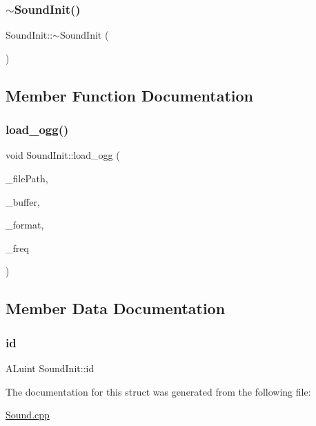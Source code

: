 \subsubsection{\texorpdfstring{$\sim$\+Sound\+Init()}{~SoundInit()}}
{\footnotesize\ttfamily Sound\+Init\+::$\sim$\+Sound\+Init (\begin{DoxyParamCaption}{ }\end{DoxyParamCaption})\hspace{0.3cm}{\ttfamily [inline]}}



\subsection{Member Function Documentation}
\mbox{\label{struct_sound_init_adc9642cf26b528304eb9cd85bd178889}} 
\subsubsection{\texorpdfstring{load\+\_\+ogg()}{load\_ogg()}}
{\footnotesize\ttfamily void Sound\+Init\+::load\+\_\+ogg (\begin{DoxyParamCaption}\item[{std\+::string}]{\+\_\+file\+Path,  }\item[{std\+::vector$<$ char $>$ \&}]{\+\_\+buffer,  }\item[{A\+Lenum \&}]{\+\_\+format,  }\item[{A\+Lsizei \&}]{\+\_\+freq }\end{DoxyParamCaption})\hspace{0.3cm}{\ttfamily [inline]}}



\subsection{Member Data Documentation}
\mbox{\label{struct_sound_init_a1b59128bbf63c76a8bd40019b3090447}} 
\subsubsection{\texorpdfstring{id}{id}}
{\footnotesize\ttfamily A\+Luint Sound\+Init\+::id}



The documentation for this struct was generated from the following file\+:\begin{DoxyCompactItemize}
\item 
\mbox{\hyperlink{_sound_8cpp}{Sound.\+cpp}}\end{DoxyCompactItemize}

